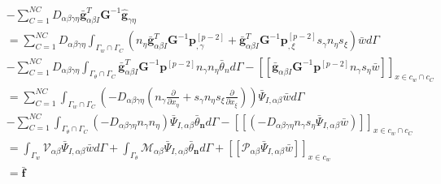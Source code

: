 \begin{equation}
 \begin{split}
    &-\sum_{C=1}^{N\!C}D_{\alpha\beta\gamma\eta}\bar{\pmb g}_{\alpha\beta I}^T\pmb G^{-1}\hat{\pmb g}_{\gamma\eta }\\
    &=\sum_{C=1}^{N\!C}D_{\alpha\beta\gamma\eta}\int_{{\Gamma_w}\cap{\Gamma_C}}(n_{\eta}
    \bar{\pmb g}_{\alpha\beta I}^T\pmb G^{-1}\pmb{p}^{[p-2]}_{,\gamma}+\bar{\pmb g}_{\alpha\beta I}^T
   \pmb G^{-1}\pmb{p}^{[p-2]}_{,\xi}s_{\gamma}n_{\eta}s_{\xi})\bar{w}d\Gamma\\
    &-\sum_{C=1}^{N\!C}D_{\alpha\beta\gamma\eta}\int_{{\Gamma_{\theta}}\cap{\Gamma_{C}}}\bar{\pmb g}^T_{\alpha\beta I}\pmb G^{-1}\pmb{p}^{[p-2]}n_{\gamma}n_{\eta}\bar{\theta}_nd\Gamma-[[\bar{\pmb g}_{\alpha\beta I}\pmb G^{-1}\pmb{p}^{[p-2]}n_{\gamma}s_{\eta}\bar{w}]]_{x\in{c_w}\cap{c_C}}\\
    &=\sum_{C=1}^{N\!C}\int_{{\Gamma_w}\cap{\Gamma_C}}(-D_{\alpha\beta\gamma\eta}(n_{\gamma}\frac{\partial}{\partial x_{\eta}}+s_{\gamma}n_{\eta}s_{\xi}\frac{\partial}{\partial x_{\xi}}))\bar{\Psi}_{I,\alpha\beta}\bar{w}d\Gamma\\
    &-\sum_{C=1}^{N\!C}\int_{{\Gamma_{\theta}}\cap{\Gamma_C}}(-D_{\alpha\beta\gamma\eta}n_{\gamma}n_{\eta})\bar{\Psi}_{I,\alpha\beta}\bar{\theta}_{\pmb n}d\Gamma-[[(-D_{\alpha\beta\gamma\eta}n_{\gamma}s_{\eta}\bar{\Psi}_{I,\alpha\beta}\bar{w})]]_{x\in{c_w}\cap{c_C}}\\
    &=\int_{\Gamma_w}\mathcal{V}_{\alpha\beta}\bar{\Psi}_{I,\alpha\beta}\bar{w}d\Gamma+\int_{\Gamma_{\theta}}\mathcal{M}_{\alpha\beta}\bar{\Psi}_{I,\alpha\beta}\bar{\theta}_{\pmb n}d\Gamma+[[\mathcal{P}_{\alpha\beta}\bar{\Psi}_{I,\alpha\beta}\bar{w}]]_{x\in{c_w}}\\
    &=\bar{\pmb f}
\end{split}
\end{equation}
